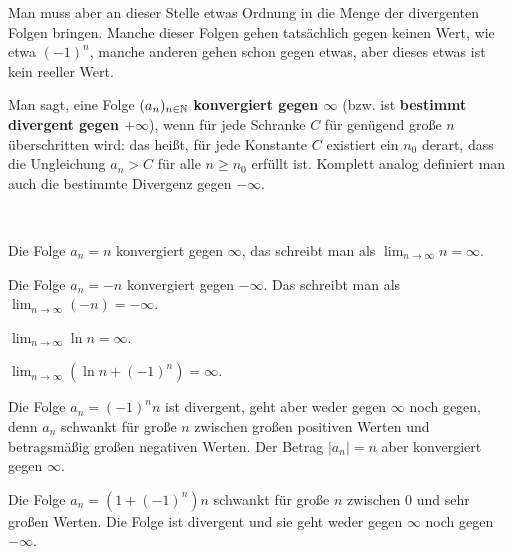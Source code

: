 \begin{bem}
	Man muss aber an dieser Stelle etwas Ordnung in die Menge der divergenten Folgen bringen. Manche dieser Folgen gehen tatsächlich gegen keinen Wert, wie etwa $(-1)^n$, manche anderen gehen schon gegen etwas, aber dieses etwas ist kein reeller Wert. 
\end{bem} 

\begin{defn} 
	Man sagt, eine Folge $(a_n)_{n \in \mathbb{N}}$ \textbf{konvergiert gegen $\infty$}  (bzw. ist \textbf{bestimmt divergent gegen $+\infty$}), wenn für jede Schranke $C$ für genügend große $n$ überschritten wird: das heißt, für jede Konstante $C$ existiert ein $n_0$ derart, dass die Ungleichung $a_n > C$ für alle $n \ge n_0$ erfüllt ist. Komplett analog definiert man auch die bestimmte Divergenz gegen $-\infty$. 
\end{defn} 

\begin{bsp} {\ } 
	\begin{enuma}
		\item Die Folge $a_n = n$ konvergiert gegen $\infty$, das schreibt man als $\lim_{n \to \infty} n = \infty$. 
		\item  Die Folge $a_n = -n$ konvergiert gegen $-\infty$. Das schreibt man als $\lim_{n \to \infty} (-n) = -\infty$. 
		\item $\lim_{n \to \infty} \ln n = \infty$. 
		\item $\lim_{n \to \infty} (\ln n + (-1)^n) = \infty$. 
		\item Die Folge $a_n = (-1)^n n$ ist divergent, geht aber weder gegen $\infty$ noch gegen, denn $a_n$ schwankt für große $n$ zwischen großen positiven Werten und betragsmäßig großen negativen Werten. Der Betrag $|a_n| = n$ aber konvergiert gegen $\infty$. 
		\item Die Folge $a_n = ( 1 + (-1)^n) n$ schwankt für große $n$ zwischen $0$ und sehr großen Werten. Die Folge ist divergent und sie geht weder gegen $\infty$ noch gegen $-\infty$. 
	\end{enuma}
\end{bsp} 



